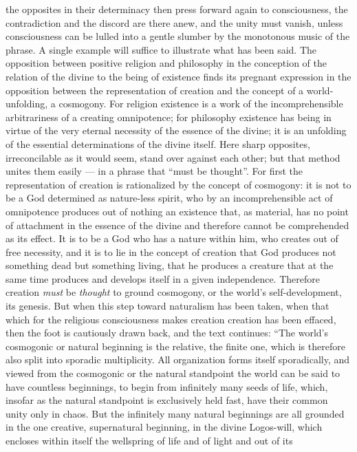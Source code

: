 \documentclass[12pt,a4paper,openany]{book}
\newcommand{\opage}[1]{\marginnote{\footnotesize\textit{[#1]}}}
\begin{document}
the opposites in their determinacy then press forward again
to consciousness, the contradiction and the discord are there anew, and
the unity must vanish, unless consciousness can be lulled into
a gentle slumber by the monotonous music of the phrase. A single
example will suffice to illustrate what has been said. The opposition
between positive religion and philosophy in the conception
of the relation of the divine to the being of existence finds its
pregnant expression in the opposition between the representation of creation
and the concept of a world-unfolding, a cosmogony. For
religion existence is a work of the incomprehensible arbitrariness
of a creating omnipotence; for philosophy existence has being
in virtue of the very eternal necessity of the essence of the divine; it
is an unfolding of the essential determinations of the divine itself.
Here sharp opposites, irreconcilable as it would seem, stand
over against each other; but that method unites
them easily --- in a phrase that ``must be thought''. For first
the representation of creation is rationalized by the concept of cosmogony:
\opage{441}it is not to be a God determined as nature-less spirit, who
by an incomprehensible act of omnipotence produces out of nothing
an existence that, as material, has no point of attachment
in the essence of the divine and therefore cannot be comprehended
as its effect. It is to be a God who has a
nature within him, who creates out of free necessity, and it is to
lie in the concept of creation that God produces not something dead
but something living, that he produces a creature that at the same time
produces and develops itself in a given independence.
Therefore creation \emph{must} be \emph{thought} to ground cosmogony,
or the world's self-development, its genesis. But when
this step toward naturalism has been taken, when that which
for the religious consciousness makes creation creation has been
effaced, then the foot is cautiously drawn back, and the text
continues: ``The world's cosmogonic or natural beginning
is the relative, the finite one, which is therefore also split into
sporadic multiplicity. All organization forms itself sporadically,
and viewed from the cosmogonic or the natural
standpoint the world can be said to have countless beginnings,
to begin from infinitely many seeds of life, which, insofar
as the natural standpoint is exclusively held fast,
have their common unity only in chaos. But the infinitely
many natural beginnings are all grounded in the one
creative, supernatural beginning, in the divine Logos-will,
which encloses within itself the wellspring of life and of light and out of its
\end{document}
